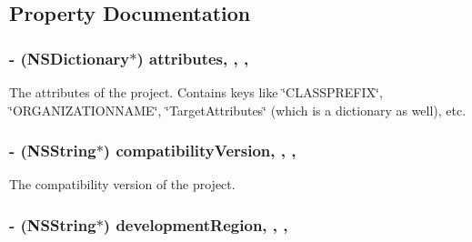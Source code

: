 \subsection{Property Documentation}
\hypertarget{interface_f_f_x_c_project_a3d9174cba610fb35ea7ca328afe29149}{
\subsubsection[{attributes}]{\setlength{\rightskip}{0pt plus 5cm}-\/ (N\-S\-Dictionary$\ast$) attributes\hspace{0.3cm}{\ttfamily [read]}, {\ttfamily [write]}, {\ttfamily [nonatomic]}, {\ttfamily [strong]}}}\label{interface_f_f_x_c_project_a3d9174cba610fb35ea7ca328afe29149}
The attributes of the project. Contains keys like \char`\"{}\-C\-L\-A\-S\-S\-P\-R\-E\-F\-I\-X\char`\"{}, \char`\"{}\-O\-R\-G\-A\-N\-I\-Z\-A\-T\-I\-O\-N\-N\-A\-M\-E\char`\"{}, \char`\"{}\-Target\-Attributes\char`\"{} (which is a dictionary as well), etc. \hypertarget{interface_f_f_x_c_project_a0778f80dd66714ad94b18792dad005bc}{
\subsubsection[{compatibility\-Version}]{\setlength{\rightskip}{0pt plus 5cm}-\/ (N\-S\-String$\ast$) compatibility\-Version\hspace{0.3cm}{\ttfamily [read]}, {\ttfamily [write]}, {\ttfamily [nonatomic]}, {\ttfamily [strong]}}}\label{interface_f_f_x_c_project_a0778f80dd66714ad94b18792dad005bc}
The compatibility version of the project. \hypertarget{interface_f_f_x_c_project_aa081d75ef031c02b0ba9f653a4028c26}{
\subsubsection[{development\-Region}]{\setlength{\rightskip}{0pt plus 5cm}-\/ (N\-S\-String$\ast$) development\-Region\hspace{0.3cm}{\ttfamily [read]}, {\ttfamily [write]}, {\ttfamily [nonatomic]}, {\ttfamily [strong]}}}\label{interface_f_f_x_c_project_aa081d75ef031c02b0ba9f653a4028c26}
